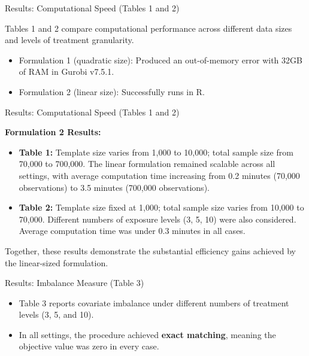 \documentclass{beamer}
\begin{document}
\begin{frame}{Results: Computational Speed  (Tables 1 and 2)}


Tables 1 and 2 compare computational performance across different data sizes and levels of treatment granularity.

\begin{itemize}
	\item Formulation 1 (quadratic size): Produced an out-of-memory error with 32GB of RAM in Gurobi v7.5.1.
	\item Formulation 2 (linear size): Successfully runs in R.
\end{itemize}


\end{frame}


\begin{frame}{Results: Computational Speed (Tables 1 and 2)}

\textbf{Formulation 2 Results:}
\begin{itemize}
    \item \textbf{Table 1:} Template size varies from 1,000 to 10,000; total sample size from 70,000 to 700,000.  
    The linear formulation remained scalable across all settings, with average computation time increasing from 0.2 minutes (70,000 observations) to 3.5 minutes (700,000 observations).
    
    \item \textbf{Table 2:} Template size fixed at 1,000; total sample size varies from 10,000 to 70,000.  
    Different numbers of exposure levels (3, 5, 10) were also considered. Average computation time was under 0.3 minutes in all cases.
\end{itemize}

\vspace{0.3cm}
Together, these results demonstrate the substantial efficiency gains achieved by the linear-sized formulation.

\end{frame}

\begin{frame}{Results: Imbalance Measure (Table 3) }
\begin{itemize}
	\item Table 3 reports covariate imbalance under different numbers of treatment levels (3, 5, and 10).  
	\item In all settings, the procedure achieved \textbf{exact matching}, meaning the objective value was zero in every case.
\end{itemize}
\end{frame} 
\end{document}
